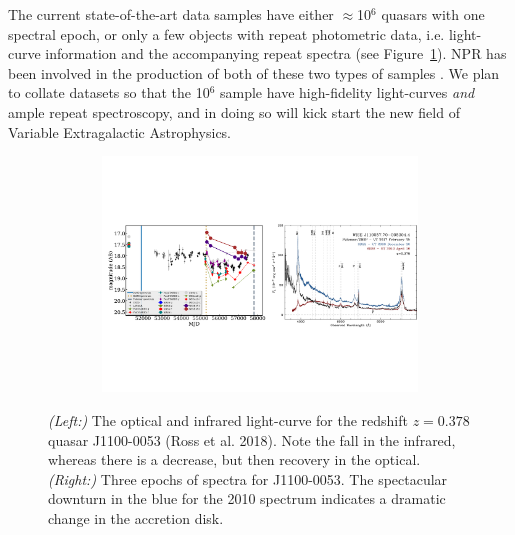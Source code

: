 \documentclass[oneside, a4paper, onecolumn, 11pt]{article}
\begin{document}
\smallskip
\noindent
The current state-of-the-art data samples have either
$\approx$10$^{6}$ quasars with one spectral epoch, or only a few
objects with repeat photometric data, i.e. light-curve information and
the accompanying repeat spectra (see Figure~\ref{fig:J110057}).  NPR
has been involved in the production of both of these two types of
samples \citep{MacLeod2016, Paris2017}. We plan to collate datasets so
that the 10$^{6}$ sample have high-fidelity light-curves {\it and}
ample repeat spectroscopy, and in doing so will kick start the new
field of Variable Extragalactic Astrophysics. 



\begin{figure}[h]
  \begin{center}
    \hspace{-0.5cm}
    \includegraphics[height=6.25cm,width=17.2cm]
    {figures/J110057_LC_Spectra_20171024.pdf}
    \vspace{-10pt}
    \caption{%
      \footnotesize 
      {\it (Left:)} The optical and infrared light-curve for the redshift $z=0.378$ quasar 
      J1100-0053 (Ross et al. 2018). 
      Note the fall in the infrared, whereas there is a decrease, but 
      then recovery in the optical. 
      {\it (Right:)} 
      Three epochs of spectra for J1100-0053. 
      The spectacular downturn in the blue for the 2010 spectrum 
      indicates a dramatic change in the accretion disk.
    }
  \vspace{-16pt}
 \label{fig:J110057}
\end{center}
\end{figure}
\end{document}
